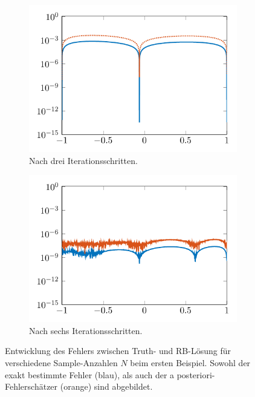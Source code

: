 \documentclass[../main.tex]{subfiles}
\begin{document}
\begin{figure}[tb]
\begin{subfigure}[b]{0.495\textwidth}
        \includegraphics[width=1\textwidth]{figures/chapter5/ch5ex1_rbmerr_plot_3.pdf}
        \caption{Nach drei Iterationsschritten.}
    \end{subfigure}
    \begin{subfigure}[b]{0.495\textwidth}
        \centering
        \includegraphics[width=1\textwidth]{figures/chapter5/ch5ex1_rbmerr_plot_6.pdf}
        \caption{Nach sechs Iterationsschritten.}
    \end{subfigure}
    \caption[Entwicklung des Fehlers zwischen Truth- und RB-Lösung für verschiedene RB-Dimensionen $N$, erstes Beispiel.]{%
    Entwicklung des Fehlers zwischen Truth- und RB-Lösung für verschiedene Sample-Anzahlen $N$ beim ersten Beispiel.
    Sowohl der exakt bestimmte Fehler (blau), als auch der a posteriori-Fehlerschätzer (orange) sind abgebildet.}
    \label{figure:vergleich_rbm_iterationen}
\end{figure}
\end{document}
